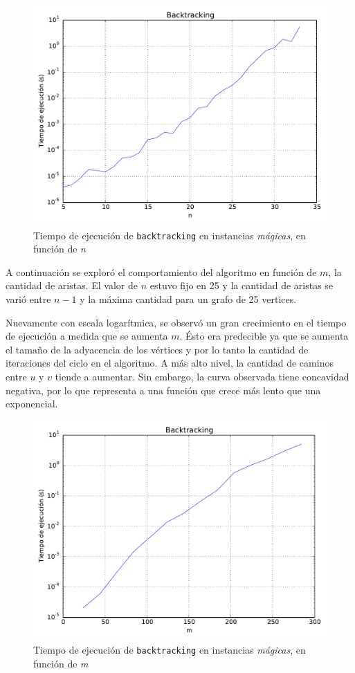 \begin{figure}[H]
    \begin{center}
        \includegraphics[width=\textwidth]{imagenes/backtracking-complejidad-funcion-de-n.pdf}
        \caption{Tiempo de ejecución de \texttt{backtracking} en instancias \textit{mágicas}, en función de \textit{n}}
    \end{center}
\end{figure}

\newpage
A continuación se exploró el comportamiento del algoritmo en función de $m$, la cantidad de aristas. El valor de $n$ estuvo fijo en 25 y la cantidad de aristas se varió entre $n-1$ y la máxima cantidad para un grafo de 25 vertices.

Nuevamente con escala logarítmica, se observó un gran crecimiento en el tiempo de ejecución a medida que se aumenta $m$. Ésto era predecible ya que se aumenta el tamaño de la adyacencia de los vértices y por lo tanto la cantidad de iteraciones del ciclo en el algoritmo. A más alto nivel, la cantidad de caminos entre $u$ y $v$ tiende a aumentar. Sin embargo, la curva observada tiene concavidad negativa, por lo que representa a una función que crece más lento que una exponencial.

\begin{figure}[H]
    \begin{center}
        \includegraphics[width=\textwidth]{imagenes/backtracking-complejidad-funcion-de-m.pdf}
        \caption{Tiempo de ejecución de \texttt{backtracking} en instancias \textit{mágicas}, en función de \textit{m}}
    \end{center}
\end{figure}
